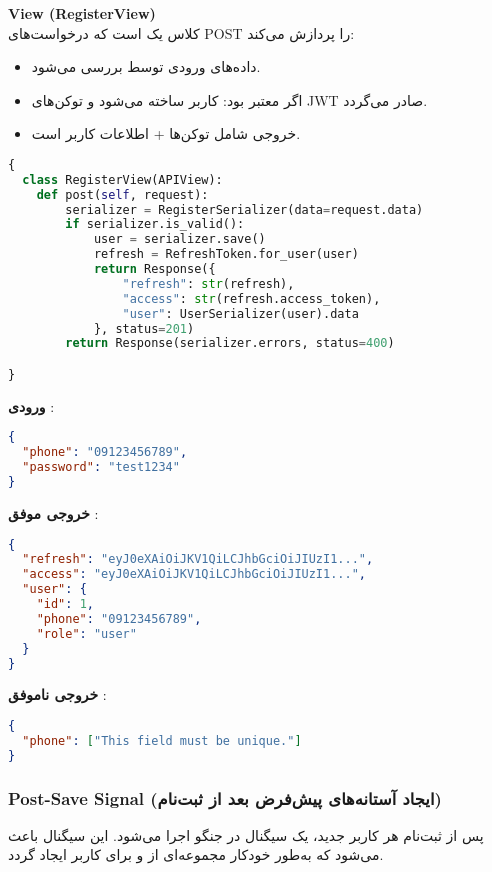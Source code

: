 \documentclass{report}
\begin{document}
\textbf{View (RegisterView)} \\
کلاس  یک  است که درخواست‌های POST را پردازش می‌کند:
\begin{itemize}
  \item داده‌های ورودی توسط  بررسی می‌شود.
  \item اگر معتبر بود: کاربر ساخته می‌شود و توکن‌های JWT صادر می‌گردد.
  \item خروجی شامل توکن‌ها + اطلاعات کاربر است.
\end{itemize}

\begin{lstlisting}[language=python ]
{
  class RegisterView(APIView):
    def post(self, request):
        serializer = RegisterSerializer(data=request.data)
        if serializer.is_valid():
            user = serializer.save()
            refresh = RefreshToken.for_user(user)
            return Response({
                "refresh": str(refresh),
                "access": str(refresh.access_token),
                "user": UserSerializer(user).data
            }, status=201)
        return Response(serializer.errors, status=400)

}
\end{lstlisting}

\textbf{ورودی }:
\begin{lstlisting}[language=json]
{
  "phone": "09123456789",
  "password": "test1234"
}
\end{lstlisting}

\textbf{خروجی موفق }:
\begin{lstlisting}[language=json]
{
  "refresh": "eyJ0eXAiOiJKV1QiLCJhbGciOiJIUzI1...",
  "access": "eyJ0eXAiOiJKV1QiLCJhbGciOiJIUzI1...",
  "user": {
    "id": 1,
    "phone": "09123456789",
    "role": "user"
  }
}
\end{lstlisting}

\textbf{خروجی ناموفق }:
\begin{lstlisting}[language=json]
{
  "phone": ["This field must be unique."]
}
\end{lstlisting}
\subsubsection{Post-Save Signal (ایجاد آستانه‌های پیش‌فرض بعد از ثبت‌نام)}

پس از ثبت‌نام هر کاربر جدید، یک سیگنال  در جنگو اجرا می‌شود. این سیگنال باعث می‌شود که به‌طور خودکار مجموعه‌ای از  و  برای کاربر ایجاد گردد.
\end{document}
